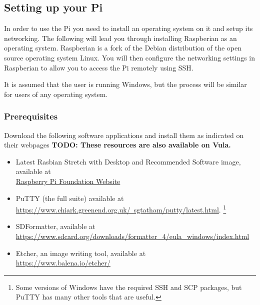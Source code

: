 \subsection{Setting up your Pi}
In order to use the Pi you need to install an operating system on it and setup its networking.  The following will lead you through installing Raspberian as an operating system.  Raspberian  is a fork of the Debian distribution of the open source operating system Linux.  You will then configure the networking settings in Raspberian to allow you to access the Pi remotely using SSH.  

It is assumed that the user is running Windows, but the process will be similar for users of any operating system.

\subsubsection{Prerequisites}
\label{sec:Prereqs}
Download the following software applications and install them as indicated on their webpages
\textbf{TODO: These resources are also available on Vula.}
\begin{itemize}
    \item Latest Rasbian Stretch with Desktop and Recommended Software image, available at\\ \href{https://www.raspberrypi.org/downloads/raspbian}{Raspberry Pi Foundation Website}
    \item PuTTY (the full suite) available at\\ \href{https://www.chiark.greenend.org.uk/~sgtatham/putty/latest.html}{https://www.chiark.greenend.org.uk/~sgtatham/putty/latest.html}. \footnote{Some versions of Windows have the required SSH and SCP packages, but PuTTY has many other tools that are useful.}
    \item SDFormatter, available at\\ \href{https://www.sdcard.org/downloads/formatter_4/eula_windows/index.html}{https://www.sdcard.org/downloads/formatter\_4/eula\_windows/index.html}
    \item Etcher, an image writing tool, available at\\
    \href{https://www.balena.io/etcher/}{https://www.balena.io/etcher/}
\end{itemize}

